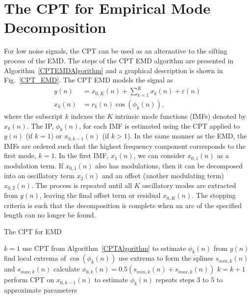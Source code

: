 \documentclass[11pt,draftcls,onecolumn]{IEEEtran}
\begin{document}
\section{The CPT for Empirical Mode Decomposition}\label{sect:CPTEMDSection}
For low noise signals, the CPT can be used as an alternative to the sifting process of the EMD. The steps of the CPT EMD algorithm are presented in Algorithm~\ref{CPTEMDAlgorithm} and a graphical description is shown in Fig.~\ref{CPT_EMD}. The CPT EMD models the signal as
\begin{align}
    y(n) &= x_{0,K}(n) + \sum_{k=1}^{K}x_k(n) + \varepsilon(n) \\
    x_k\left(n\right) &= r_k\left(n\right)\cos\left(\phi_k\left(n\right)\right),
\end{align}
where the subscript $k$ indexes the $K$ intrinsic mode functions (IMFs) denoted by $x_k(n)$. The IP, $\phi_k(n)$, for each IMF is estimated using the CPT applied to $y(n)$ (if $k=1$) or $x_{0,k-1}(n)$ (if $k>1$). In the same manner as the EMD, the IMFs are ordered such that the highest frequency component corresponds to the first mode, $k=1$. In the first IMF, $x_1(n)$, we can consider $x_{0,1}(n)$ as a modulation term. If $x_{0,1}(n)$ also has modulations, then it can be decomposed into an oscillatory term $x_2(n)$ and an offset (another modulating term) $x_{0,2}(n)$. The process is repeated until all $K$ oscillatory modes are extracted from $y(n)$, leaving the final offset term or residual $x_{0,K}(n)$. The stopping criteria is such that the decomposition is complete when an arc of the specified length can no longer be found.

\begin{algorithm}[ht]
\caption{The CPT for EMD}\label{CPTEMDAlgorithm}
\begin{algorithmic}[1]
\State $k=1$
\State use CPT from Algorithm~\ref{CPTAlgorithm} to estimate $\phi_k(n)$ from $y(n)$
\State find local extrema of $\cos\left(\phi_k(n)\right)$
\State use extrema to form the splines $s_{min,k}(n)$ and $s_{max,k}(n)$
\State calculate $x_{0,k}(n) = 0.5\left(s_{min,k}(n) + s_{max,k}(n)\right)$
    \State $k=k+1$
    \State perform CPT on $x_{0,k-1}(n)$ to estimate $\phi_{k}(n)$
    \State repeats steps 3 to 5 to approximate parameters
\EndWhile
\end{algorithmic}
\end{algorithm}
\end{document}
